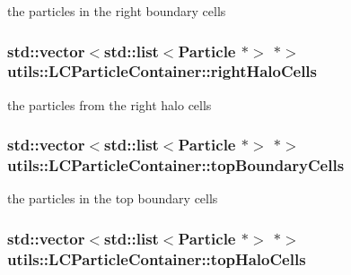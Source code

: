 the particles in the right boundary cells \hypertarget{classutils_1_1LCParticleContainer_a564e78ce48736ad36753ce33935adfb6}{
\subsubsection[{right\-Halo\-Cells}]{\setlength{\rightskip}{0pt plus 5cm}std\-::vector$<$std\-::list$<${\bf Particle} $\ast$$>$ $\ast$$>$ utils\-::\-L\-C\-Particle\-Container\-::right\-Halo\-Cells\hspace{0.3cm}{\ttfamily [private]}}}\label{classutils_1_1LCParticleContainer_a564e78ce48736ad36753ce33935adfb6}
the particles from the right halo cells \hypertarget{classutils_1_1LCParticleContainer_af4c6176f13f695f7f368630a05a4775e}{
\subsubsection[{top\-Boundary\-Cells}]{\setlength{\rightskip}{0pt plus 5cm}std\-::vector$<$std\-::list$<${\bf Particle} $\ast$$>$ $\ast$$>$ utils\-::\-L\-C\-Particle\-Container\-::top\-Boundary\-Cells\hspace{0.3cm}{\ttfamily [private]}}}\label{classutils_1_1LCParticleContainer_af4c6176f13f695f7f368630a05a4775e}
the particles in the top boundary cells \hypertarget{classutils_1_1LCParticleContainer_a6b94126cff371182cc606c68a71e0044}{
\subsubsection[{top\-Halo\-Cells}]{\setlength{\rightskip}{0pt plus 5cm}std\-::vector$<$std\-::list$<${\bf Particle} $\ast$$>$ $\ast$$>$ utils\-::\-L\-C\-Particle\-Container\-::top\-Halo\-Cells\hspace{0.3cm}{\ttfamily [private]}}}\label{classutils_1_1LCParticleContainer_a6b94126cff371182cc606c68a71e0044}
